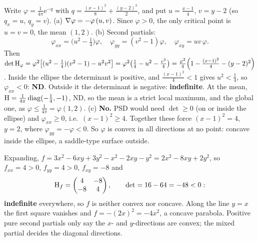 \begin{solutions}
  \item Write $\varphi=\tfrac1{4\pi}\mathrm{e}^{-q}$ with
        $q=\tfrac{(x-1)^{2}}{8}+\tfrac{(y-2)^{2}}{2}$, and put
        $u=\tfrac{x-1}{4}$, $v=y-2$ (so $q_x=u$, $q_y=v$).
        (a) $\nabla\varphi=-\varphi\,(u,v)$. Since $\varphi>0$, the only
        critical point is $u=v=0$, the mean $(1,2)$.
        (b) Second partials:
        \[
          \varphi_{xx}=\bigl(u^{2}-\tfrac14\bigr)\varphi,\quad
          \varphi_{yy}=(v^{2}-1)\varphi,\quad
          \varphi_{xy}=uv\,\varphi .
        \]
        Then
        $\det\operatorname{H}_\varphi=\varphi^{2}\bigl[(u^{2}-\tfrac14)(v^{2}-1)-u^{2}v^{2}\bigr]
        =\varphi^{2}\bigl(\tfrac14-u^{2}-\tfrac{v^{2}}{4}\bigr)
        =\tfrac{\varphi^{2}}{4}\Bigl(1-\tfrac{(x-1)^{2}}{4}-(y-2)^{2}\Bigr)$.
        Inside the ellipse the determinant is positive, and
        $\tfrac{(x-1)^{2}}{4}<1$ gives $u^{2}<\tfrac14$, so
        $\varphi_{xx}<0$: \textbf{ND}. Outside it the determinant is
        negative: \textbf{indefinite}. At the mean,
        $\operatorname{H}=\tfrac{1}{4\pi}\operatorname{diag}(-\tfrac14,-1)$, ND, so the
        mean is a strict local maximum, and the global one, as
        $\varphi\le\tfrac{1}{4\pi}=\varphi(1,2)$.
        (c) \textbf{No.} PSD would need $\det\ge0$ (on or inside the
        ellipse) and $\varphi_{xx}\ge0$, i.e.\ $(x-1)^{2}\ge4$. Together
        these force $(x-1)^{2}=4$, $y=2$, where
        $\varphi_{yy}=-\varphi<0$. So $\varphi$ is convex in all directions
        at no point: concave inside the ellipse, a saddle-type surface
        outside.

  \item Expanding, $f=3x^{2}-6xy+3y^{2}-x^{2}-2xy-y^{2}=2x^{2}-8xy+2y^{2}$,
        so $f_{xx}=4>0$, $f_{yy}=4>0$, $f_{xy}=-8$ and
        \[
          \operatorname{H}_f=\begin{pmatrix}4&-8\\-8&4\end{pmatrix},\qquad
          \det=16-64=-48<0 :
        \]
        \textbf{indefinite} everywhere, so $f$ is neither convex nor
        concave. Along the line $y=x$ the first square vanishes and
        $f=-(2x)^{2}=-4x^{2}$, a concave parabola. Positive pure second
        partials only say the $x$- and $y$-directions are convex; the
        mixed partial decides the diagonal directions.
        \begin{gallery}
        \hfill
        \hfill\null
        \end{gallery}


\end{solutions}
